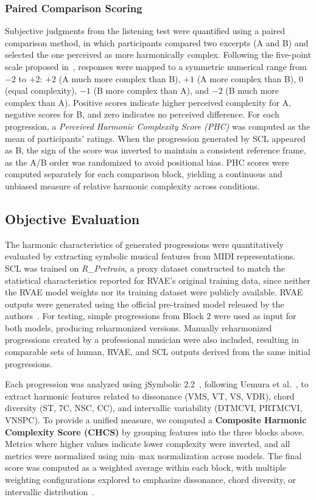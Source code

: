 \documentclass[conference]{IEEEtran}
\begin{document}
\subsubsection{Paired Comparison Scoring}
Subjective judgments from the listening test were quantified using a paired comparison method, in which participants compared two excerpts (A and B) and selected the one perceived as more harmonically complex. Following the five-point scale proposed in~\cite{parizet2005comparison}, responses were mapped to a symmetric numerical range from $-2$ to $+2$: $+2$ (A much more complex than B), $+1$ (A more complex than B), $0$ (equal complexity), $-1$ (B more complex than A), and $-2$ (B much more complex than A). Positive scores indicate higher perceived complexity for A, negative scores for B, and zero indicates no perceived difference. For each progression, a \textit{Perceived Harmonic Complexity Score (PHC)} was computed as the mean of participants’ ratings. When the progression generated by SCL appeared as B, the sign of the score was inverted to maintain a consistent reference frame, as the A/B order was randomized to avoid positional bias. PHC scores were computed separately for each comparison block, yielding a continuous and unbiased measure of relative harmonic complexity across conditions.
\subsection{Objective Evaluation}
\label{sec:objetive}
The harmonic characteristics of generated progressions were quantitatively evaluated by extracting symbolic musical features from MIDI representations. SCL was trained on \textit{R\_Pretrain}, a proxy dataset constructed to match the statistical characteristics reported for RVAE's original training data, since neither the RVAE model weights nor its training dataset were publicly available. RVAE outputs were generated using the official pre-trained model released by the authors~\cite{rvaeresources}. For testing, simple progressions from Block 2 were used as input for both models, producing reharmonized versions. Manually reharmonized progressions created by a professional musician were also included, resulting in comparable sets of human, RVAE, and SCL outputs derived from the same initial progressions.

Each progression was analyzed using jSymbolic 2.2~\cite{mckay2018jsymbolic}, following Uemura et al.~\cite{uemura2022morphing}, to extract harmonic features related to dissonance (VMS, VT, VS, VDR), chord diversity (ST, 7C, NSC, CC), and intervallic variability (DTMCVI, PRTMCVI, VNSPC).
To provide a unified measure, we computed a \textbf{Composite Harmonic Complexity Score (CHCS)} by grouping features into the three blocks above. Metrics where higher values indicate lower complexity were inverted, and all metrics were normalized using min--max normalization across models. The final score was computed as a weighted average within each block, with multiple weighting configurations explored to emphasize dissonance, chord diversity, or intervallic distribution~\cite{buongiorno2022towards}.
\end{document}
